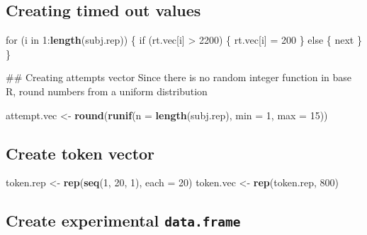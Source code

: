 \documentclass[]{article}
\newenvironment{Shaded}{\begin{snugshade}}{\end{snugshade}}
\newcommand{\KeywordTok}[1]{\textcolor[rgb]{0.13,0.29,0.53}{\textbf{{#1}}}}
\newcommand{\DataTypeTok}[1]{\textcolor[rgb]{0.13,0.29,0.53}{{#1}}}
\newcommand{\DecValTok}[1]{\textcolor[rgb]{0.00,0.00,0.81}{{#1}}}
\newcommand{\StringTok}[1]{\textcolor[rgb]{0.31,0.60,0.02}{{#1}}}
\newcommand{\NormalTok}[1]{{#1}}
\begin{document}
\subsection{Creating timed out values}\label{creating-timed-out-values}

\begin{Shaded}
\begin{Highlighting}[]
\NormalTok{for (i in }\DecValTok{1}\NormalTok{:}\KeywordTok{length}\NormalTok{(subj.rep)) \{}
  \NormalTok{if (rt.vec[i] >}\StringTok{ }\DecValTok{2200}\NormalTok{) \{}
    \NormalTok{rt.vec[i] =}\StringTok{ }\DecValTok{200}
  \NormalTok{\} else \{}
    \NormalTok{next}
  \NormalTok{\}}
\NormalTok{\}}
\end{Highlighting}
\end{Shaded}

\#\# Creating attempts vector Since there is no random integer function
in base R, round numbers from a uniform distribution

\begin{Shaded}
\begin{Highlighting}[]
\NormalTok{attempt.vec <-}\StringTok{ }\KeywordTok{round}\NormalTok{(}\KeywordTok{runif}\NormalTok{(}\DataTypeTok{n =} \KeywordTok{length}\NormalTok{(subj.rep), }\DataTypeTok{min =} \DecValTok{1}\NormalTok{, }\DataTypeTok{max =} \DecValTok{15}\NormalTok{))}
\end{Highlighting}
\end{Shaded}

\subsection{Create token vector}\label{create-token-vector}

\begin{Shaded}
\begin{Highlighting}[]
\NormalTok{token.rep <-}\StringTok{ }\KeywordTok{rep}\NormalTok{(}\KeywordTok{seq}\NormalTok{(}\DecValTok{1}\NormalTok{, }\DecValTok{20}\NormalTok{, }\DecValTok{1}\NormalTok{), }\DataTypeTok{each =} \DecValTok{20}\NormalTok{)}
\NormalTok{token.vec <-}\StringTok{ }\KeywordTok{rep}\NormalTok{(token.rep, }\DecValTok{800}\NormalTok{)}
\end{Highlighting}
\end{Shaded}

\subsection{\texorpdfstring{Create experimental
\texttt{data.frame}}{Create experimental data.frame}}\label{create-experimental-data.frame}
\end{document}
